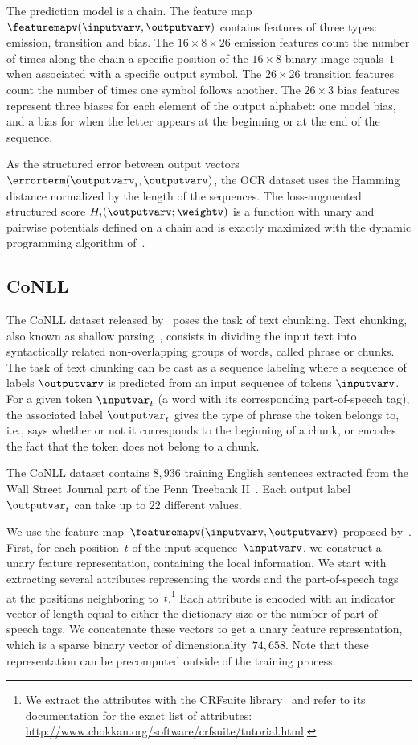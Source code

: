 \documentclass{article}
\begin{document}
The prediction model is a chain. The feature map~$\featuremapv(\inputvarv, \outputvarv)$ contains features of three types: emission, transition and bias.
The $16 \times 8 \times 26$ emission features count the number of times along the chain a specific position of the $16\times8$ binary image equals~$1$ when associated with a specific output symbol.
The $26 \times 26$ transition features count the number of times one symbol follows another.
The $26 \times 3$ bias features represent three biases for each element of the output alphabet: one model bias, and a bias for when the letter appears at the beginning or at the end of the sequence.

As the structured error between output vectors $\errorterm(\outputvarv_i,\outputvarv)$, the OCR dataset uses the Hamming distance normalized by the length of the sequences.
The loss-augmented structured score $H_i(\outputvarv;\weightv)$ is a function with unary and pairwise potentials defined on a chain and is exactly maximized with the dynamic programming algorithm of~\citet{Viterbi67}.

\subsection{CoNLL}
The CoNLL dataset released by~\citet{Sang2000} poses the task of text chunking.
Text chunking, also known as shallow parsing~, consists in dividing the input text into syntactically related non-overlapping groups of words, called phrase or chunks.
The task of text chunking can be cast as a sequence labeling where a sequence of labels $\outputvarv$ is predicted from an input sequence of tokens $\inputvarv$.
For a given token $\inputvar_t$ (a word with its corresponding part-of-speech tag), the associated label $\outputvar_t$ gives the type of phrase the token belongs to, i.e., says whether or not it corresponds to the beginning of a chunk, or encodes the fact that the token does not belong to a chunk.

%
%
%

The CoNLL dataset contains $8,936$ training English sentences extracted from the Wall Street Journal part of the Penn Treebank II~. Each output label $\outputvar_t$ can take up to $22$ different values.
%

We use the feature map~$\featuremapv(\inputvarv, \outputvarv)$ proposed by~.
First, for each position~$t$ of the input sequence~$\inputvarv$, we construct a unary feature representation, containing the local information.
We start with extracting several attributes representing the words and the part-of-speech tags at the positions neighboring to~$t$.\footnote{We extract the attributes with the CRFsuite library~ and refer to its documentation for the exact list of attributes: \url{http://www.chokkan.org/software/crfsuite/tutorial.html}.}
Each attribute is encoded with an indicator vector of length equal to either the dictionary size or the number of part-of-speech tags.
We concatenate these vectors to get a unary feature representation, which is a sparse binary vector of dimensionality~$74,658$.
Note that these representation can be precomputed outside of the training process.
\end{document}
